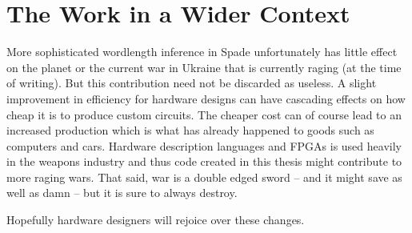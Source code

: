 \section{The Work in a Wider Context}
More sophisticated wordlength inference in Spade unfortunately has little effect on the planet or the current war in Ukraine that is currently raging (at the time of writing). But this contribution need not be discarded as useless. A slight improvement in efficiency for hardware designs can have cascading effects on how cheap it is to produce custom circuits. The cheaper cost can of course lead to an increased production which is what has already happened to goods such as computers and cars. Hardware description languages and FPGAs is used heavily in the weapons industry and thus code created in this thesis might contribute to more raging wars. That said, war is a double edged sword -- and it might save as well as damn -- but it is sure to always destroy.

Hopefully hardware designers will rejoice over these changes.

